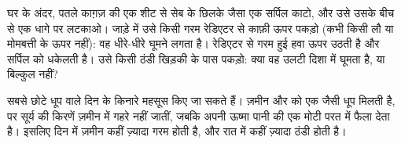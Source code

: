 \begin{inthelab}
घर के अंदर, पतले काग़ज़ की एक शीट से सेब के छिलके जैसा एक सर्पिल काटो, और उसे उसके
बीच से एक धागे पर लटकाओ। जाड़े में उसे किसी गरम रेडिएटर से काफ़ी ऊपर पकड़ो (कभी किसी
लौ या मोमबत्ती के ऊपर नहीं): वह धीरे-धीरे घूमने लगता है। रेडिएटर से गरम हुई हवा ऊपर
उठती है और सर्पिल को धकेलती है। उसे किसी ठंडी खिड़की के पास पकड़ो: क्या वह उलटी
दिशा में घूमता है, या बिल्कुल नहीं?
\end{inthelab}

सबसे छोटे  धूप वाले दिन  के किनारे महसूस किए जा सकते हैं। ज़मीन और
 को एक जैसी धूप मिलती है, पर सूर्य की किरणें ज़मीन में गहरे नहीं जातीं, जबकि
 अपनी ऊष्मा पानी की एक मोटी परत में फैला देता है। इसलिए दिन में ज़मीन कहीं
ज़्यादा गरम होती है, और रात में कहीं ज़्यादा ठंडी
होती है।

